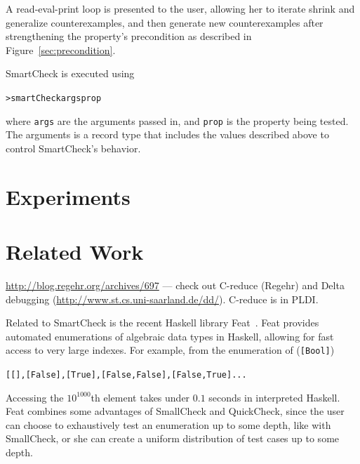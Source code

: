 \documentclass[10pt]{sigplanconf}
\newenvironment{code}{\begin{alltt}\small}{\end{alltt}}
\newcommand{\ttp}[1]{\texttt{#1}}
\begin{document}
A read-eval-print loop is presented to the user, allowing her to iterate shrink
and generalize counterexamples, and then generate new counterexamples after
strengthening the property's precondition as described in
Figure~\ref{sec:precondition}.

SmartCheck is executed using
%
\begin{code}
> smartCheck args prop
\end{code}
%
\noindent
where \ttp{args} are the arguments passed in, and \ttp{prop} is the property
being tested.  The arguments is a record type that includes the values described
above to control SmartCheck's behavior.


\section{Experiments}\label{sec:experiments}




\section{Related Work}\label{sec:related}

\url{http://blog.regehr.org/archives/697} --- check out C-reduce (Regehr) and Delta%
  debugging (\url{http://www.st.cs.uni-saarland.de/dd/}).  C-reduce is in PLDI.%

Related to SmartCheck is the recent Haskell library Feat~\cite{feat}.  Feat
provides automated enumerations of algebraic data types in Haskell, allowing for
fast access to very large indexes.  For example, from the enumeration of
(\ttp{[Bool]})
%
\begin{code}
[[],[False],[True],[False,False],[False,True] ...
\end{code}
%
\noindent
Accessing the $10^{1000}$th element takes under $0.1$ seconds in interpreted
Haskell.  Feat combines some advantages of SmallCheck and QuickCheck, since the
user can choose to exhaustively test an enumeration up to some depth, like with
SmallCheck, or she can create a uniform distribution of test cases up to some
depth.  
\end{document}
